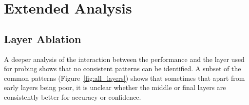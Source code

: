 \section{Extended Analysis}
\label{sec:appendix_analysis}

\subsection{Layer Ablation}


A deeper analysis of the interaction between the performance and the layer used for probing shows that no consistent patterns can be identified. A subset of the common patterns (Figure~\ref{fig:all_layers}) shows that sometimes that apart from early layers being poor, it is unclear whether the middle or final layers are consistently better for accuracy or confidence. 

